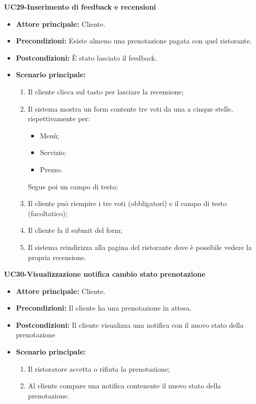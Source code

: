 \begin{itemize}
\begin{itemize}
\textbf{UC29-Inserimento di feedback e recensioni}
\begin{itemize}
\item \textbf{Attore principale:} Cliente.
\item \textbf{Precondizioni:} Esiste almeno una prenotazione pagata con quel ristorante.
\item \textbf{Postcondizioni:} È stato lasciato il feedback.
\item \textbf{Scenario principale:}
\begin{enumerate}
    \item Il cliente clicca sul tasto per lasciare la recensione;
    \item Il sistema mostra un form contente tre voti da una a cinque stelle, rispettivamente per:
  \begin{itemize}
    \item Menù;
    \item Servizio;
    \item Prezzo.
  \end{itemize}
      Segue poi un campo di testo;
    \item Il cliente può riempire i tre voti (obbligatori) e il campo di testo (facoltatico);
    \item Il cliente fa il submit del form;
    \item Il sistema reindirizza alla pagina del ristorante dove è possibile vedere la propria recensione.
\end{enumerate}
\end{itemize}

\textbf{UC30-Visualizzazione notifica cambio stato prenotazione}
\begin{itemize}
\item \textbf{Attore principale:} Cliente.
\item \textbf{Precondizioni:} Il cliente ha una prenotazione in attesa.
\item \textbf{Postcondizioni:} Il cliente visualizza una notifica con il nuovo stato della prenotazione
\item \textbf{Scenario principale:}
\begin{enumerate}
    \item Il ristoratore accetta o rifiuta la prenotazione;
    \item Al cliente compare una notifica contenente il nuovo stato della prenotazione.
\end{enumerate}
\end{itemize}


\end{itemize}
\end{itemize}
